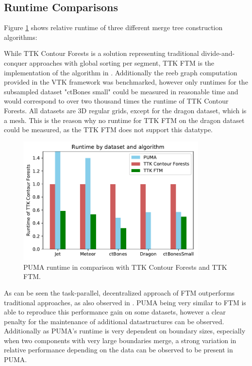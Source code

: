 \documentclass{scrartcl}
\begin{document}
\subsection{Runtime Comparisons}
Figure \ref{fig:runtime} shows relative runtime of three different merge tree construction algorithms:

While TTK Contour Forests is a solution representing traditional divide-and-conquer approaches with global sorting per segment, TTK FTM is the implementation of the algorithm in \cite{FTM}. Additionally the reeb graph computation provided in the VTK framework was benchmarked, however only runtimes for the subsampled dataset "ctBones small" could be measured in reasonable time and would correspond to over two thousand times the runtime of TTK Contour Forests. All datasets are 3D regular grids, except for the dragon dataset, which is a mesh. This is the reason why no runtime for TTK FTM on the dragon dataset could be measured, as the TTK FTM does not support this datatype. 

\begin{figure}[h]
\centering
\includegraphics[width=0.85\textwidth]{figures/runtime.pdf}
\caption{PUMA runtime in comparison with TTK Contour Forests and TTK FTM.}
\label{fig:runtime}
\end{figure}

As can be seen the task-parallel, decentralized approach of FTM outperforms  traditional approaches, as also observed in \cite{FTM}. PUMA being very similar to FTM is able to reproduce this performance gain on some datasets, however a clear penalty for the maintenance of additional datastructures can be observed. Additionally as PUMA's runtime is very dependent on boundary sizes, especially when two components with very large boundaries merge, a strong variation in relative performance depending on the data can be observed to be present in PUMA. 
\end{document}
